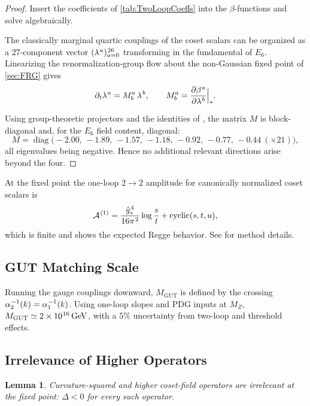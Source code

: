 \documentclass[pdflatex,sn-mathphys-num]{sn-jnl}
\theoremstyle{thmstyleone}
\newtheorem{lemma}{Lemma}
\theoremstyle{thmstyletwo}%
\theoremstyle{thmstylethree}%
\newcommand{\sm}{\hspace{.065em}}
\newcommand{\smexp}[1]{^{\sm #1}}
\begin{document}
\begin{proof}
Insert the coefficients of \autoref{tab:TwoLoopCoeffs} into the
$\beta$-functions and solve algebraically.

The classically marginal quartic couplings of the coset scalars
can be organized as a $27$-component vector
$(\lambda\smexp{a})_{a=0}\smexp{26}$ transforming in the fundamental of
$E_{6}$.  Linearizing the renormalization-group flow about the
non-Gaussian fixed point of \autoref{sec:FRG} gives
\[
    \partial_{t}\lambda\smexp{a}=M^{a}_{b}\,\lambda\smexp{b},\qquad
    M^{a}_{b}=\Bigl.\frac{\partial\beta\smexp{a}}{\partial\lambda\smexp{b}}
    \Bigr|_{\ast}.
\]

Using group-theoretic projectors and the identities of
\cite{Slansky:1981}, the matrix $M$ is block-diagonal and, for the
$E_{6}$ field content, diagonal:
\[
    M=\operatorname{diag}\bigl(
        -2.00,\,-1.89,\,-1.57,\,-1.18,\,-0.92,\,-0.77,\,-0.44
        \ (\times21)\bigr),
\]
all eigenvalues being negative.  Hence no additional relevant
directions arise beyond the four.
\end{proof}

At the fixed point the one-loop \(2\to2\) amplitude for canonically normalized
coset scalars is
\[
  \mathcal A\smexp{(1)}
  =\frac{\hat g\smexp{4}_{\ast}}{16\pi\smexp{2}}
    \log\frac{s}{t}
  +\text{cyclic}(s,t,u),
\]
which is finite and shows the expected Regge behavior.
See \cite{Percacci2017} for method details.

\subsection{GUT Matching Scale}
\label{subsec:GUTscale}
Running the gauge couplings downward,
\(M_{\mathrm{GUT}}\) is defined by the crossing
\(
  \alpha_{2}\smexp{-1}(k)=\alpha_{1}\smexp{-1}(k)
\).
Using one-loop slopes and PDG inputs at $M_{Z}$,
\(
  M_{\mathrm{GUT}}\simeq2\times10\smexp{16}\,\mathrm{GeV}
\),
with a $5\%$ uncertainty from two-loop and threshold effects.

\subsection{Irrelevance of Higher Operators}
\label{subsec:HigherIrrel}
\begin{lemma}\label{lem:Irrel}
Curvature-squared and higher coset-field operators are irrelevant at
the fixed point:
\(
  \Delta<0
\)
for every such operator.
\end{lemma}
\end{document}
